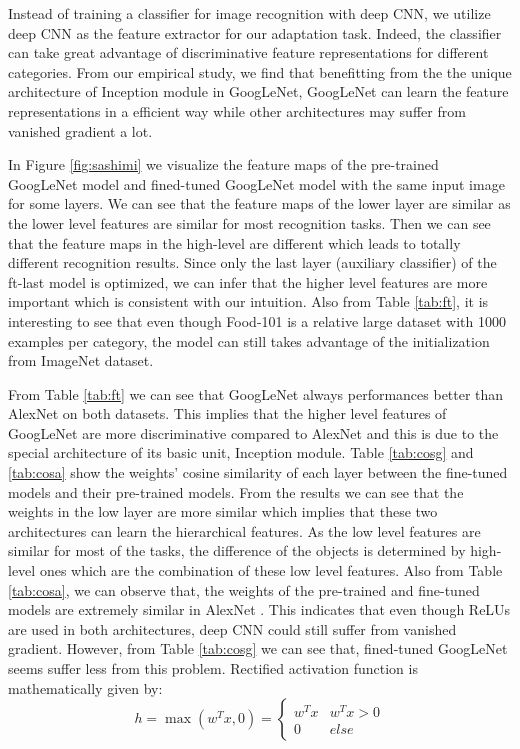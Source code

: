 Instead of training a classifier for image recognition with deep CNN, we utilize deep CNN as the feature extractor for our adaptation task. Indeed, the classifier can take great advantage of discriminative feature representations for different categories. From our empirical study, we find that benefitting from the the unique architecture of Inception module in GoogLeNet, GoogLeNet can learn the feature representations in a efficient way while other architectures may suffer from vanished gradient a lot.

In Figure \ref{fig:sashimi} we visualize the feature maps of the pre-trained GoogLeNet model and fined-tuned GoogLeNet model with the same input image for some layers. We can see that the feature maps of the lower layer are similar as the lower level features are similar for most recognition tasks.
Then we can see that the feature maps in the high-level are different which leads to totally different recognition results.
Since only the last layer (auxiliary classifier) of the ft-last model is optimized, we can infer that the higher level features are more important which is consistent with our intuition. Also from Table \ref{tab:ft}, it is interesting to see that even though Food-101 is a relative large dataset with 1000 examples per category, the model can still takes advantage of the initialization from ImageNet dataset. 

From Table \ref{tab:ft} we can see that GoogLeNet always performances better than AlexNet on both datasets. This implies that the higher level features of GoogLeNet are more discriminative compared to AlexNet and this is due to the special architecture of its basic unit, Inception module. Table \ref{tab:cosg} and \ref{tab:cosa} show the weights' cosine similarity of each layer between the fine-tuned models and their pre-trained models. From the results we can see that the weights in the low layer are more similar which implies that these two architectures can learn the hierarchical features. As the low level features are similar for most of the tasks, the difference of the objects is determined by high-level ones which are the combination of these low level features. Also from Table \ref{tab:cosa}, we can observe that, the weights of the pre-trained and fine-tuned models are extremely similar in AlexNet . This indicates that even though ReLUs are used in both architectures, deep CNN could still suffer from vanished gradient. However, from Table \ref{tab:cosg} we can see that, fined-tuned GoogLeNet seems suffer less from this problem.
Rectified activation function is mathematically given by:
      \begin{equation}\label{relu}
        h = \max ({w^T}x,0) = \left\{ {\begin{array}{*{20}{c}}
{{w^T}x}&{{w^T}x > 0}\\
0&{else}
\end{array}} \right.
      \end{equation}

